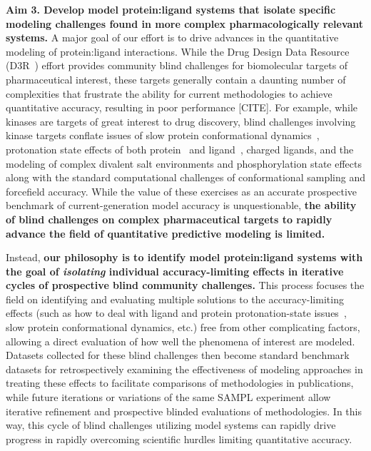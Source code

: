 \documentclass[11pt]{article}
\begin{document}
{\bf Aim 3. Develop model protein:ligand systems that isolate specific modeling challenges found in more complex pharmacologically relevant systems.}
A major goal of our effort is to drive advances in the quantitative modeling of protein:ligand interactions.
While the Drug Design Data Resource (D3R~\cite{gathiaka_d3r_2016}) effort provides community blind challenges for biomolecular targets of pharmaceutical interest, these targets generally contain a daunting number of complexities that frustrate the ability for current methodologies to achieve quantitative accuracy, resulting in poor performance [CITE].
For example, while kinases are targets of great interest to drug discovery, blind challenges involving kinase targets conflate issues of slow protein conformational dynamics~\cite{Lin:2013:Proc.Natl.Acad.Sci.a}, protonation state effects of both protein~\cite{Shan:2009:PNAS} and ligand~\cite{Szakacs:2005:JournalofMedicinalChemistrya,Grante:2014:SpectrochimicaActaPartA:MolecularandBiomolecularSpectroscopy}, charged ligands, and the modeling of complex divalent salt environments and phosphorylation state effects along with the standard computational challenges of conformational sampling and forcefield accuracy.
While the value of these exercises as an accurate prospective benchmark of current-generation model accuracy is unquestionable, {\bf the ability of blind challenges on complex pharmaceutical targets to rapidly advance the field of quantitative predictive modeling is limited.}

Instead, {\bf our philosophy is to identify model protein:ligand systems with the goal of \emph{isolating} individual accuracy-limiting effects in iterative cycles of prospective blind community challenges.}
This process focuses the field on identifying and evaluating multiple solutions to the accuracy-limiting effects (such as how to deal with ligand and protein protonation-state issues~\cite{Onufriev:2013:QuarterlyReviewsofBiophysics}, slow protein conformational dynamics, etc.) free from other complicating factors, allowing a direct evaluation of how well the phenomena of interest are modeled.
Datasets collected for these blind challenges then become standard benchmark datasets for retrospectively examining the effectiveness of modeling approaches in treating these effects to facilitate comparisons of methodologies in publications, while future iterations or variations of the same SAMPL experiment allow iterative refinement and prospective blinded evaluations of methodologies.
In this way, this cycle of blind challenges utilizing model systems can rapidly drive progress in rapidly overcoming scientific hurdles limiting quantitative accuracy.
\end{document}
